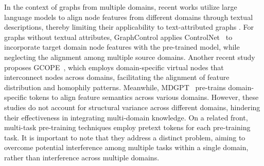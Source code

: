 In the context of graphs from multiple domains, recent works \cite{liu2023one,tang2024higpt,xia2024opengraph} utilize large language models to align node features from different domains through textual descriptions, thereby limiting their applicability to text-attributed graphs \cite{zhaolearning,wen2023prompt,zhang2024text}. For graphs without textual attributes, GraphControl \cite{zhu2024graphcontrol} applies ControlNet~\cite{zhang2023adding} to incorporate target domain node features with the pre-trained model, while neglecting the alignment among multiple source domains. Another recent study proposes GCOPE~\cite{zhao2024all}, which employs domain-specific virtual nodes that interconnect nodes across domains, facilitating the alignment of feature distribution and homophily patterns. Meanwhile, MDGPT~\cite{yu2024text} pre-trains domain-specific tokens to align feature semantics across various domains. However, these studies do not account for structural variance across different domains, hindering their effectiveness in integrating multi-domain knowledge. On a related front, multi-task pre-training techniques \cite{wang2022multi,yu2023multigprompt} employ pretext tokens for each pre-training task. It is important to note that they address a distinct problem, aiming to overcome potential interference among multiple tasks within a single domain, rather than interference across multiple domains. 
